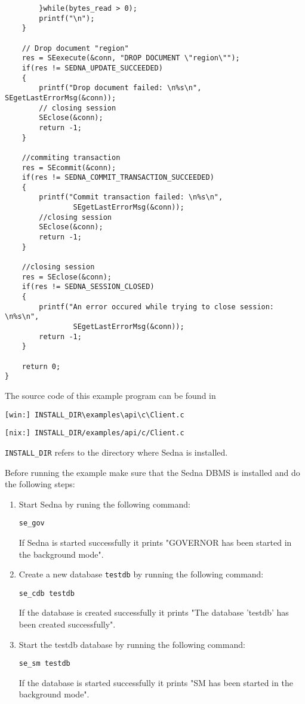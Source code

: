 \documentclass[a4paper,12pt]{article}
\begin{document}
{\begin{verbatim}
        }while(bytes_read > 0);
    	printf("\n");
    }

    // Drop document "region"
    res = SEexecute(&conn, "DROP DOCUMENT \"region\"");
    if(res != SEDNA_UPDATE_SUCCEEDED)
    {
        printf("Drop document failed: \n%s\n", SEgetLastErrorMsg(&conn));
        // closing session
        SEclose(&conn);
        return -1;
    }

    //commiting transaction
    res = SEcommit(&conn);
    if(res != SEDNA_COMMIT_TRANSACTION_SUCCEEDED)
    {
        printf("Commit transaction failed: \n%s\n",
                SEgetLastErrorMsg(&conn));
        //closing session
        SEclose(&conn);
        return -1;
    }

    //closing session
    res = SEclose(&conn);
    if(res != SEDNA_SESSION_CLOSED)
    {
        printf("An error occured while trying to close session: \n%s\n",
                SEgetLastErrorMsg(&conn));
        return -1;
    }

    return 0;
}
\end{verbatim}
}

The source code of this example program can be found in
\begin{verbatim}
[win:] INSTALL_DIR\examples\api\c\Client.c
\end{verbatim}
\begin{verbatim}
[nix:] INSTALL_DIR/examples/api/c/Client.c
\end{verbatim}

\verb!INSTALL_DIR! refers to the directory where Sedna is installed.

Before running the example make sure that the Sedna DBMS is installed and do the following steps:
\begin{enumerate}
\item Start Sedna by runing the following command:
\begin{verbatim}
se_gov
\end{verbatim}
If Sedna is started successfully it prints "GOVERNOR has been started in
the background mode".
\item Create a new database \verb!testdb! by running the following command:
\begin{verbatim}
se_cdb testdb
\end{verbatim}
If the database is created successfully it prints "The database 'testdb'
has been created successfully".
\item Start the testdb database by running the following command:
\begin{verbatim}
se_sm testdb
\end{verbatim}
If the database is started successfully it prints "SM has been started in
the background mode".
\end{enumerate}
\end{document}
